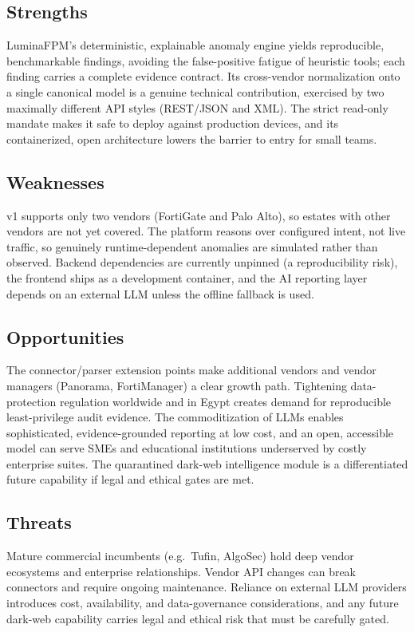 \subsection{Strengths}
LuminaFPM's deterministic, explainable anomaly engine yields reproducible, benchmarkable findings, avoiding the false-positive fatigue of heuristic tools; each finding carries a complete evidence contract. Its cross-vendor normalization onto a single canonical model is a genuine technical contribution, exercised by two maximally different API styles (REST/JSON and XML). The strict read-only mandate makes it safe to deploy against production devices, and its containerized, open architecture lowers the barrier to entry for small teams.

\subsection{Weaknesses}
v1 supports only two vendors (FortiGate and Palo Alto), so estates with other vendors are not yet covered. The platform reasons over configured intent, not live traffic, so genuinely runtime-dependent anomalies are simulated rather than observed. Backend dependencies are currently unpinned (a reproducibility risk), the frontend ships as a development container, and the AI reporting layer depends on an external LLM unless the offline fallback is used.

\subsection{Opportunities}
The connector/parser extension points make additional vendors and vendor managers (Panorama, FortiManager) a clear growth path. Tightening data-protection regulation worldwide and in Egypt creates demand for reproducible least-privilege audit evidence. The commoditization of LLMs enables sophisticated, evidence-grounded reporting at low cost, and an open, accessible model can serve SMEs and educational institutions underserved by costly enterprise suites. The quarantined dark-web intelligence module is a differentiated future capability if legal and ethical gates are met.

\subsection{Threats}
Mature commercial incumbents (e.g.\ Tufin, AlgoSec) hold deep vendor ecosystems and enterprise relationships. Vendor API changes can break connectors and require ongoing maintenance. Reliance on external LLM providers introduces cost, availability, and data-governance considerations, and any future dark-web capability carries legal and ethical risk that must be carefully gated.

